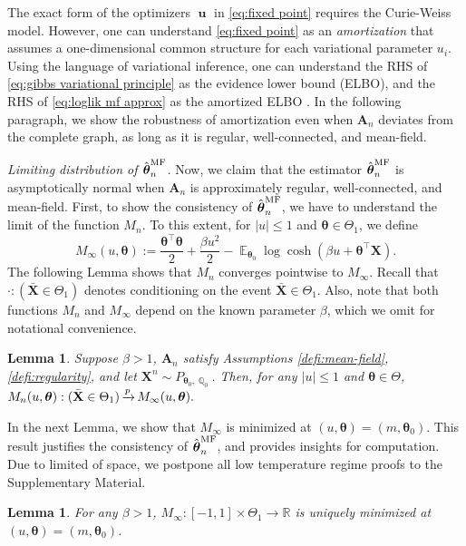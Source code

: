 \documentclass[preprint,reqno]{imsart}
\newtheorem{lemma}[thm]{Lemma}
\newcommand{\ttheta}{\boldsymbol{\theta}}
\DeclareMathOperator{\bu}{\textbf{u}}
\DeclareMathOperator{\xp}{\xrightarrow{\mathnormal p}}
\DeclareMathOperator{\EE}{\mathbb{E}}
\DeclareMathOperator{\QQ}{\mathbb{Q}}
\newcommand{\A}{\mathbf{A}}
\newcommand{\X}{\mathbf{X}}
\newcommand{\thetamf}{\hat{\boldsymbol \theta}^{\text{MF}}_{\mathnormal n}}
\begin{document}
{The exact form of the optimizers $\bu$ in \eqref{eq:fixed point} requires the Curie-Weiss model. However, one can understand \eqref{eq:fixed point} as an \emph{amortization} that assumes a one-dimensional common structure for each variational parameter $u_i$. Using the language of variational inference, one can understand the RHS of \eqref{eq:gibbs variational principle} as the evidence lower bound (ELBO), and the RHS of \eqref{eq:loglik mf approx} as the amortized ELBO \citep{blei2017variational,ganguly2023amortized}. In the following paragraph, we show the robustness of amortization even when $\A_n$ deviates from the complete graph, as long as it is regular, well-connected, and mean-field.}


\vspace{2mm}
\noindent \emph{Limiting distribution of $\thetamf$.} Now, we claim that the estimator $\thetamf$ is asymptotically normal when $\A_n$ is approximately regular, well-connected, and mean-field. First, to show the consistency of $\thetamf$, we have to understand the limit of the function $M_n$. To this extent, for $|u| \le 1$ and $ \ttheta\in \Theta_1$, we define %
$$M_{\infty}(u,\ttheta) := \frac{\ttheta^{\top} \ttheta}{2} + \frac{\beta u^2}{2} - \EE_{\ttheta_0} \log \cosh (\beta u + \ttheta^{\top} \X).$$
%
The following Lemma shows that $M_n$ converges pointwise to $M_{\infty}$.
Recall that $\cdot:(\bar{\X} \in \Theta_1)$ denotes conditioning on the event $\bar{\X} \in \Theta_1$. Also, note that both functions $M_n$ and $M_{\infty}$ depend on the known parameter $\beta$, which we omit for notational convenience.
%

\begin{lemma}\label{lem:conditional limit }
Suppose $\beta > 1$, $\A_n$ satisfy Assumptions \ref{defi:mean-field}, \ref{defi:regularity}, and let $\X^n \sim P_{\ttheta_0, \QQ_{0}}$. Then, for any $|u| \le 1$ and $\ttheta\in \Theta$, $M_n(u, \ttheta) : (\bar{\X} \in \Theta_1) \xp M_\infty(u,\ttheta).$
\end{lemma}

%

In the next Lemma, we show that $M_{\infty}$ is minimized at $(u, \ttheta) = (m, \ttheta_0)$. This result justifies the consistency of $\thetamf$, and provides insights for computation. Due to limited of space, we postpone all low temperature regime proofs to the Supplementary Material.


\begin{lemma}\label{lem:uniqueness of minimizer} 
For any $\beta > 1$, $M_{\infty}:[-1,1]\times \Theta_1 \to \mathbb{R}$ is uniquely minimized at $(u, \ttheta) = (m, \ttheta_0)$.
%
\end{lemma}
\end{document}
